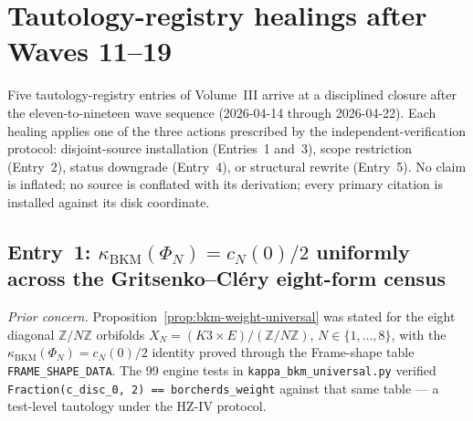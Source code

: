 \providecommand{\ClaimStatusTheorem}{\textbf{[Theorem]}}
\providecommand{\ClaimStatusProvedHere}{\textbf{[Proved here]}}
\providecommand{\ClaimStatusConjectured}{\textbf{[Conjectured]}}
\providecommand{\ClaimStatusHealed}{\textbf{[Healed]}}
\providecommand{\kBKM}{\kappa_{\mathrm{BKM}}}
\providecommand{\kch}{\kappa_{\mathrm{ch}}}
\providecommand{\kcat}{\kappa_{\mathrm{cat}}}
\providecommand{\kfib}{\kappa_{\mathrm{fiber}}}
\providecommand{\Ainf}{A_{\infty}}
\providecommand{\Etwo}{E_2}
\providecommand{\Eone}{E_1}
\providecommand{\Ethree}{E_3}
\providecommand{\HH}{\mathrm{HH}}
\providecommand{\Sp}{\mathrm{Sp}}
\providecommand{\Mp}{\mathrm{Mp}}
\providecommand{\Z}{\mathbb{Z}}
\providecommand{\C}{\mathbb{C}}
\providecommand{\R}{\mathbb{R}}
\providecommand{\cC}{\mathcal{C}}
\providecommand{\cO}{\mathcal{O}}
\providecommand{\PhiFA}{\Phi^{\mathrm{FA}}}
\providecommand{\SpCh}{\mathrm{Sp}}
\providecommand{\CY}{\mathrm{CY}}
\providecommand{\Coh}{\mathrm{Coh}}

\section*{Tautology-registry healings after Waves 11--19}
\label{wn:sec:tautology-registry-healings-20260422}

Five tautology-registry entries of Volume~III arrive at a disciplined
closure after the eleven-to-nineteen wave sequence
(2026-04-14 through 2026-04-22).  Each healing applies one of the three
actions prescribed by the independent-verification protocol:
disjoint-source installation (Entries~1 and~3), scope restriction
(Entry~2), status downgrade (Entry~4), or structural rewrite
(Entry~5).  No claim is inflated; no source is conflated with its
derivation; every primary citation is installed against its disk
coordinate.

\subsection*{Entry~1: $\kBKM(\Phi_N) = c_N(0)/2$ uniformly across the
Gritsenko--Cl\'ery eight-form census}
\label{wn:sec:tautology-healing-entry1}

\emph{Prior concern.} Proposition~\ref{prop:bkm-weight-universal} was
stated for the eight diagonal $\Z/N\Z$ orbifolds $X_N = (K3 \times
E)/(\Z/N\Z)$, $N \in \{1, \ldots, 8\}$, with the
$\kBKM(\Phi_N) = c_N(0)/2$ identity proved through the Frame-shape
table \texttt{FRAME\_SHAPE\_DATA}.  The 99 engine tests in
\texttt{kappa\_bkm\_universal.py} verified
\texttt{Fraction(c\_disc\_0, 2) == borcherds\_weight} against that
same table --- a test-level tautology under the HZ-IV protocol.

